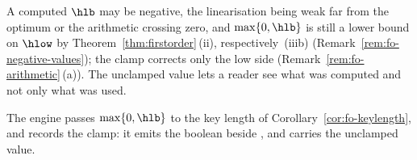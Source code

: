 
A computed $\hlb$ may be negative, the linearisation being weak far from the
optimum or the arithmetic crossing zero, and $\max\{0,\hlb\}$ is still a
lower bound on $\hlow$ by Theorem~\ref{thm:firstorder}\,(ii),
respectively~(iiib) (Remark~\ref{rem:fo-negative-values}); the clamp corrects
only the low side (Remark~\ref{rem:fo-arithmetic}\,(a)). The unclamped value
lets a reader see what was computed and not only what was used.

\begin{requirement}\label{req:first-order-clamp}
The engine passes $\max\{0,\hlb\}$ to the key length of
Corollary~\ref{cor:fo-keylength}, and records the clamp: it emits the
boolean  beside , and 
carries the unclamped value.
\end{requirement}
